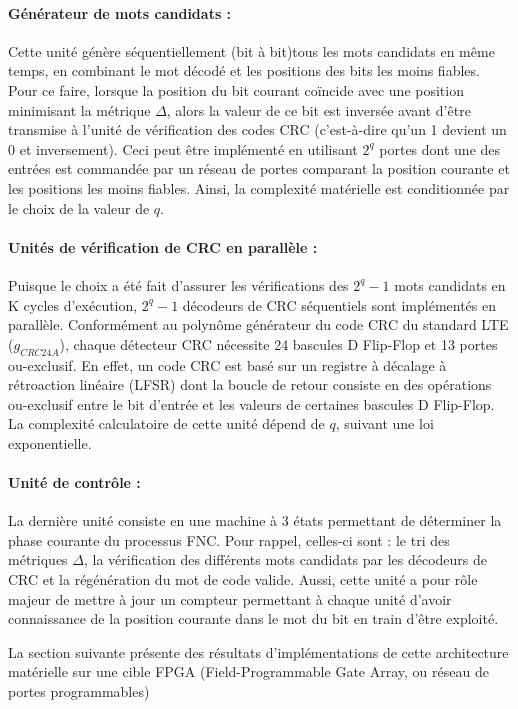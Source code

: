 \paragraph*{Générateur de mots candidats :} Cette unité génère séquentiellement (bit à bit)tous les mots candidats en 
même temps, en combinant le mot décodé et les positions des bits les moins fiables. Pour ce faire, lorsque la position 
du bit courant coïncide avec une position minimisant la métrique $\Delta$, alors la valeur de ce bit est inversée avant d'être
transmise à l'unité de vérification des codes CRC (c'est-à-dire qu'un 1 devient un 0 et inversement). Ceci peut être 
implémenté en utilisant $2^q$ portes  dont 
une des entrées est commandée par un réseau de portes  comparant la position courante et les positions les moins 
fiables. Ainsi, la complexité matérielle est conditionnée par le choix de la valeur de $q$.

\paragraph*{Unités de vérification de CRC en parallèle :} Puisque le choix a été fait d'assurer les vérifications 
des $2^q - 1$ mots candidats en K cycles d'exécution, $2^q-1$ décodeurs de CRC séquentiels sont implémentés en parallèle.
Conformément au polynôme générateur du code CRC du standard LTE ($g_{CRC24A}$), chaque détecteur CRC nécessite 24 
bascules D Flip-Flop et 13 portes ou-exclusif. En effet, un code CRC est basé sur un registre à décalage à rétroaction 
linéaire (LFSR) dont la boucle de retour consiste en des opérations ou-exclusif entre le bit d'entrée et les valeurs de
certaines  
bascules D Flip-Flop. La complexité calculatoire de cette unité dépend de $q$, suivant une loi 
exponentielle.

\paragraph*{Unité de contrôle :} La dernière unité consiste en  une machine à 3 états permettant de 
déterminer la phase courante du processus FNC. Pour rappel, celles-ci sont : le tri des métriques $\Delta$, la 
vérification des différents mots candidats par les décodeurs de CRC et la régénération du mot de code valide. Aussi, 
cette unité a pour rôle majeur de mettre à jour un compteur permettant à chaque unité d'avoir connaissance de la position 
courante dans 
le mot du bit en train d'être exploité.

La section suivante présente des résultats d'implémentations de cette architecture matérielle sur une cible FPGA 
(Field-Programmable Gate Array, ou réseau de portes programmables)

